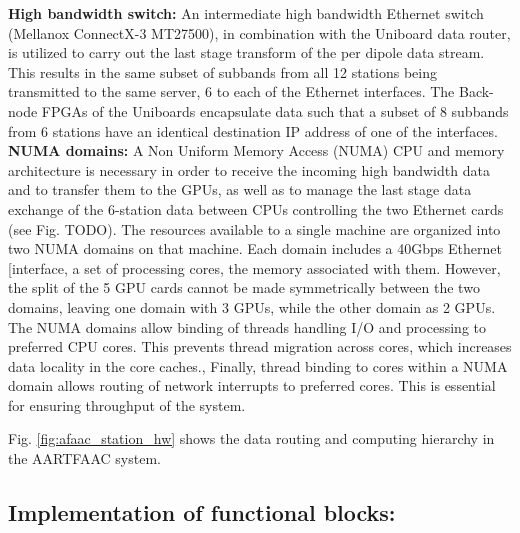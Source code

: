 \documentclass{ws-jai}
\begin{document}
\noindent  \textbf  {High  bandwidth  switch:} An  intermediate  high  bandwidth
Ethernet switch (Mellanox ConnectX-3 MT27500),  in combination with the Uniboard
data router, is utilized to carry out the last stage transform of the per dipole
data stream. This  results in the same  subset of subbands from  all 12 stations
being transmitted to the same server, 6 to each of the Ethernet interfaces.  The
Back-node  FPGAs of  the Uniboards  encapsulate  data such  that a  subset of  8
subbands from 6 stations have an identical  destination IP address of one of the
interfaces.\\

\noindent \textbf  {NUMA domains:} A  Non Uniform  Memory Access (NUMA)  CPU and
memory architecture is necessary in order to receive the incoming high bandwidth
data and to transfer them to the GPUs,  as well as to manage the last stage data
exchange of the  6-station data between CPUs controlling the  two Ethernet cards
(see Fig. TODO).  The resources available to a single machine are organized into
two  NUMA domains  on  that machine.   Each domain  includes  a 40Gbps  Ethernet
[interface, a set of processing cores,  the memory associated with them. However,
the  split of  the 5  GPU cards  cannot be  made symmetrically  between the  two
domains, leaving one domain with 3 GPUs,  while the other domain as 2 GPUs.  The
NUMA domains allow  binding of threads handling I/O and  processing to preferred
CPU cores.   This prevents thread  migration across cores, which  increases data
locality in  the core caches.,  Finally, thread binding  to cores within  a NUMA
domain  allows  routing of  network  interrupts  to  preferred cores.   This  is
essential for ensuring throughput of the system.

Fig. \ref{fig:afaac_station_hw}  shows the data routing  and computing hierarchy
in the AARTFAAC system.

\subsection {Implementation of functional  blocks:} 
\end{document}
